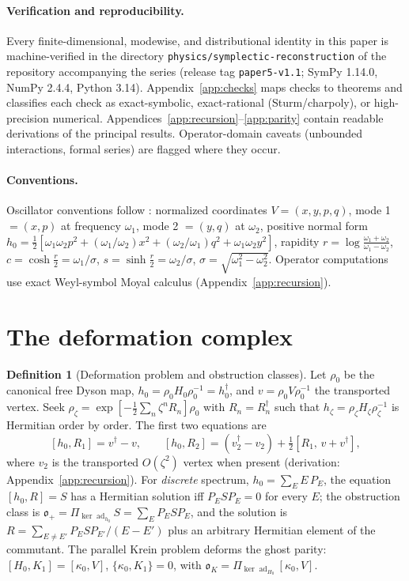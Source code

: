 \documentclass[11pt]{article}
\theoremstyle{definition}
\newtheorem{definition}[theorem]{Definition}
\theoremstyle{remark}
\newcommand{\w}{\omega}
\newcommand{\dg}{\dagger}
\newcommand{\ad}{\operatorname{ad}}
\newcommand{\ob}{\mathfrak o}
\newcommand{\kerad}{\Pi_{\ker\ad_{h_0}}}
\begin{document}
\paragraph{Verification and reproducibility.}
Every finite-dimensional, modewise, and distributional identity in this
paper is machine-verified in the directory
\texttt{physics/symplectic-reconstruction} of the repository
accompanying the series (release tag \texttt{paper5-v1.1}; SymPy
1.14.0, NumPy 2.4.4, Python 3.14).  Appendix~\ref{app:checks} maps
checks to theorems and classifies each check as exact-symbolic,
exact-rational (Sturm/charpoly), or high-precision numerical.
Appendices~\ref{app:recursion}--\ref{app:parity} contain readable
derivations of the principal results.  Operator-domain caveats
(unbounded interactions, formal series) are flagged where they occur.

\paragraph{Conventions.}
Oscillator conventions follow \cite{paperI,paperII}: normalized
coordinates $V=(x,y,p,q)$, mode 1 $=(x,p)$ at frequency $\w_1$, mode 2
$=(y,q)$ at $\w_2$, positive normal form
$h_0=\tfrac12[\w_1\w_2p^2+(\w_1/\w_2)x^2+(\w_2/\w_1)q^2+\w_1\w_2y^2]$,
rapidity $r=\log\frac{\w_1+\w_2}{\w_1-\w_2}$,
$c=\cosh\tfrac r2=\w_1/\sigma$, $s=\sinh\tfrac r2=\w_2/\sigma$,
$\sigma=\sqrt{\w_1^2-\w_2^2}$.  Operator computations use exact
Weyl-symbol Moyal calculus (Appendix~\ref{app:recursion}).

\section{The deformation complex}\label{sec:complex}

\begin{definition}[Deformation problem and obstruction classes]
\label{def:complex}
Let $\rho_0$ be the canonical free Dyson map,
$h_0=\rho_0H_0\rho_0^{-1}=h_0^{\dg}$, and $v=\rho_0V\rho_0^{-1}$ the
transported vertex.  Seek
$\rho_\zeta=\exp[-\tfrac12\sum_n\zeta^nR_n]\rho_0$ with
$R_n=R_n^{\dg}$ such that $h_\zeta=\rho_\zeta H_\zeta\rho_\zeta^{-1}$
is Hermitian order by order.  The first two equations are
\begin{equation}\label{eq:defeq}
[h_0,R_1]=v^{\dg}-v,
\qquad
[h_0,R_2]=(v_2^{\dg}-v_2)+\tfrac12[R_1,\,v+v^{\dg}],
\end{equation}
where $v_2$ is the transported $O(\zeta^2)$ vertex when present
(derivation: Appendix~\ref{app:recursion}).  For \emph{discrete}
spectrum, $h_0=\sum_EE\,P_E$, the equation $[h_0,R]=S$ has a Hermitian
solution iff $P_ESP_E=0$ for every $E$; the obstruction class is
$\ob_+=\kerad S=\sum_EP_ESP_E$, and the solution is
$R=\sum_{E\neq E'}P_ESP_{E'}/(E-E')$ plus an arbitrary Hermitian
element of the commutant.  The parallel Krein problem deforms the ghost
parity: $[H_0,K_1]=[\kappa_0,V]$, $\{\kappa_0,K_1\}=0$, with
$\ob_K=\Pi_{\ker\ad_{H_0}}[\kappa_0,V]$.
\end{definition}
\end{document}
